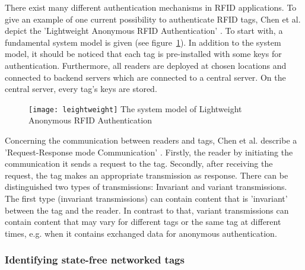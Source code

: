 There exist many different authentication mechanisms in RFID applications. To give an example of one current possibility to authenticate RFID tags, Chen et al. depict the 'Lightweight Anonymous RFID Authentication' \cite[p.39 ff.]{chen}. To start with, a fundamental system model is given (see figure~\ref{fig:lightweight}). In addition to the system model, it should be noticed that each tag is pre-installed with some keys for authentication. Furthermore, all readers are deployed at chosen locations and connected to backend servers which are connected to a central server. On the central server, every tag's keys are stored.

\begin{figure}
\centering
\texttt{[image: leightweight]} The system model of Lightweight Anonymous RFID Authentication
\caption{\label{fig:lightweight}\cite[p.40]{chen}} 
\end{figure}

Concerning the communication between readers and tags, Chen et al. describe a 'Request-Response mode Communication' \cite[p.40 ff.]{chen}. Firstly, the reader by initiating the communication it sends a request to the tag. Secondly, after receiving the request, the tag makes an appropriate transmission as response. There can be distinguished two types of transmissions: Invariant and variant transmissions. The first type (invariant transmissions) can contain content that is 'invariant' between the tag and the reader. In contrast to that, variant transmissions can contain content that may vary for different tags or the same tag at different times, e.g. when it contains exchanged data for anonymous authentication.  

\subsubsection{Identifying state-free networked tags}

